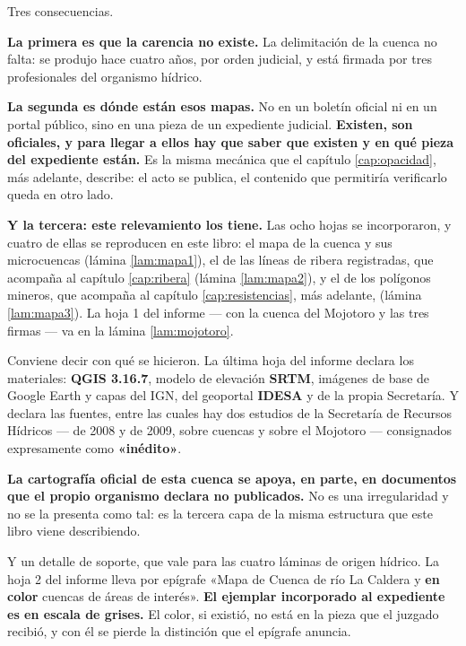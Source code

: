 Tres consecuencias.

\textbf{La primera es que la carencia no existe.} La delimitación de la cuenca no falta: se produjo hace cuatro años, por
orden judicial, y está firmada por tres profesionales del organismo hídrico.

\textbf{La segunda es dónde están esos mapas.} No en un boletín oficial ni en un portal
público, sino en una pieza de un expediente judicial. \textbf{Existen, son oficiales, y para
llegar a ellos hay que saber que existen y en qué pieza del expediente están.} Es la misma
mecánica que el capítulo \ref{cap:opacidad}, más adelante, describe: el acto se publica, el contenido que permitiría
verificarlo queda en otro lado.

\textbf{Y la tercera: este relevamiento los tiene.}
Las ocho hojas se incorporaron, y cuatro de ellas se reproducen en este libro: el
mapa de la cuenca y sus microcuencas (lámina \ref{lam:mapa1}), el de las líneas de ribera
registradas, que acompaña al capítulo \ref{cap:ribera} (lámina \ref{lam:mapa2}), y el de los polígonos
mineros, que acompaña al capítulo \ref{cap:resistencias}, más adelante, (lámina \ref{lam:mapa3}). La hoja 1 del informe
--- con la cuenca del Mojotoro y las tres firmas --- va en la lámina \ref{lam:mojotoro}.

\begin{cautela}
Conviene decir con qué se hicieron. La última hoja del informe declara los materiales:
\textbf{QGIS 3.16.7}, modelo de elevación \textbf{SRTM}, imágenes de base de Google Earth y
capas del IGN, del geoportal \textbf{IDESA} y de la propia Secretaría. Y declara las fuentes,
entre las cuales hay dos estudios de la Secretaría de Recursos Hídricos --- de 2008 y de 2009,
sobre cuencas y sobre el Mojotoro --- consignados expresamente como \textbf{«inédito»}.

\textbf{La cartografía oficial de esta cuenca se apoya, en parte, en documentos que el propio
organismo declara no publicados.} No es una irregularidad y no se la presenta como tal: es la
tercera capa de la misma estructura que este libro viene describiendo.

Y un detalle de soporte, que vale para las cuatro láminas de origen hídrico. La hoja 2 del
informe lleva por epígrafe «Mapa de Cuenca de río La Caldera y \textbf{en color} cuencas de
áreas de interés». \textbf{El ejemplar incorporado al expediente es en escala de grises.} El
color, si existió, no está en la pieza que el juzgado recibió, y con él se pierde la distinción
que el epígrafe anuncia.
\end{cautela}

